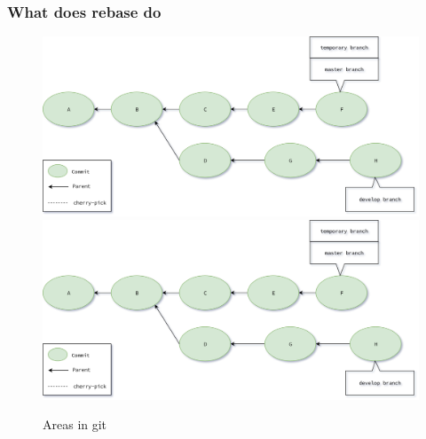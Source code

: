 \begin{frame}[fragile]
    \frametitle{What does rebase do}
    \begin{figure}
        \begin{center}
            {
                \includegraphics[width=1\textwidth,keepaspectratio]{./images/Rebase_TempBranch.png}
            }
            {
                \includegraphics[height=0.75\textheight,keepaspectratio]{./images/Rebase_TempBranch.png}
            }
            \caption{Areas in git}
        \end{center}
    \end{figure}
\end{frame}


